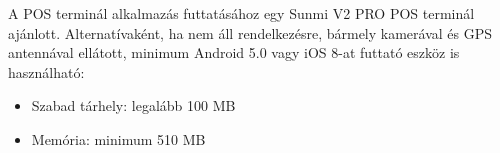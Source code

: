 A POS terminál alkalmazás futtatásához egy Sunmi V2 PRO POS terminál ajánlott. Alternatívaként, ha nem áll rendelkezésre, bármely kamerával és GPS antennával ellátott, minimum Android 5.0 vagy iOS 8-at futtató eszköz is használható:
\begin{itemize}
    \item Szabad tárhely: legalább 100 MB
    \item Memória: minimum 510 MB
\end{itemize}

